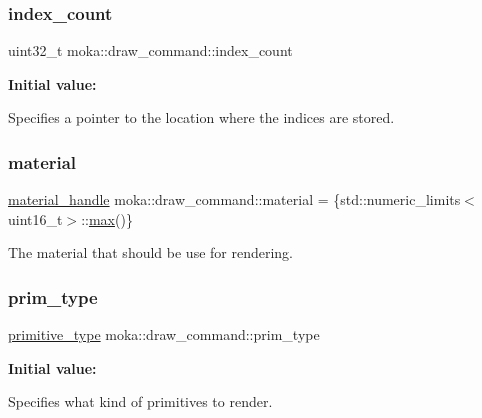 \subsubsection{\texorpdfstring{index\_count}{index\_count}}
{\footnotesize\ttfamily uint32\+\_\+t moka\+::draw\+\_\+command\+::index\+\_\+count}

{\bfseries Initial value\+:}
\begin{DoxyCode}{0}
\DoxyCodeLine{=}

\end{DoxyCode}
Specifies a pointer to the location where the indices are stored. \mbox{\label{classmoka_1_1draw__command_aa05522862c600afcd40a29dbe2df6d3d}} 
\subsubsection{\texorpdfstring{material}{material}}
{\footnotesize\ttfamily \mbox{\hyperlink{structmoka_1_1material__handle}{material\+\_\+handle}} moka\+::draw\+\_\+command\+::material = \{std\+::numeric\+\_\+limits$<$uint16\+\_\+t$>$\+::\mbox{\hyperlink{namespacemoka_acf03408f89c521244763fb5f8746ce16a2ffe4e77325d9a7152f7086ea7aa5114}{max}}()\}}

The material that should be use for rendering. \mbox{\label{classmoka_1_1draw__command_a360338ff71fd349287e88e96bf315e33}} 
\subsubsection{\texorpdfstring{prim\_type}{prim\_type}}
{\footnotesize\ttfamily \mbox{\hyperlink{namespacemoka_a345d155429e260a6344f9c555f04ae9c}{primitive\+\_\+type}} moka\+::draw\+\_\+command\+::prim\+\_\+type}

{\bfseries Initial value\+:}
\begin{DoxyCode}{0}
\DoxyCodeLine{=}

\end{DoxyCode}
Specifies what kind of primitives to render. \mbox{\label{classmoka_1_1draw__command_aa16638c2fa411a81474d75e1e385be54}} 
